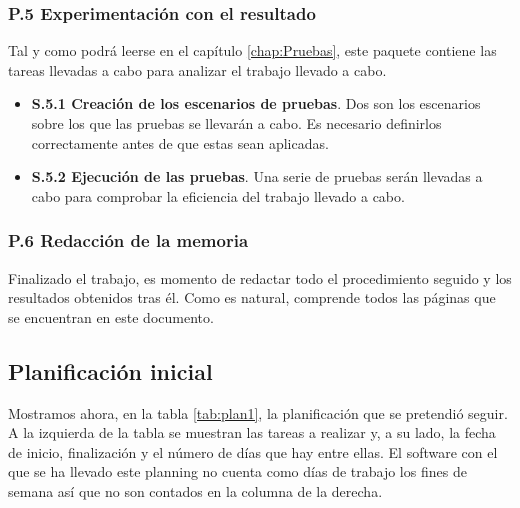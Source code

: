 \subsubsection{P.5 Experimentación con el resultado}
Tal y como podrá leerse en el capítulo \ref{chap:Pruebas}, este paquete contiene las tareas llevadas a cabo para analizar el trabajo llevado a cabo.
\begin{itemize}
\item \textbf{S.5.1 Creación de los escenarios de pruebas}. Dos son los escenarios sobre los que las pruebas se llevarán a cabo. Es necesario definirlos correctamente antes de que estas sean aplicadas.
\item \textbf{S.5.2 Ejecución de las pruebas}. Una serie de pruebas serán llevadas a cabo para comprobar la eficiencia del trabajo llevado a cabo.
\end{itemize}

\subsubsection{P.6 Redacción de la memoria}
Finalizado el trabajo, es momento de redactar todo el procedimiento seguido y los resultados obtenidos tras él. Como es natural, comprende todos las páginas que se encuentran en este documento.

\subsection{Planificación inicial}
Mostramos ahora, en la tabla \ref{tab:plan1}, la planificación que se pretendió seguir. A la izquierda de la tabla se muestran las tareas a realizar y, a su lado, la fecha de inicio, finalización y el número de días que hay entre ellas. El software con el que se ha llevado este planning no cuenta como días de trabajo los fines de semana así que no son contados en la columna de la derecha.

